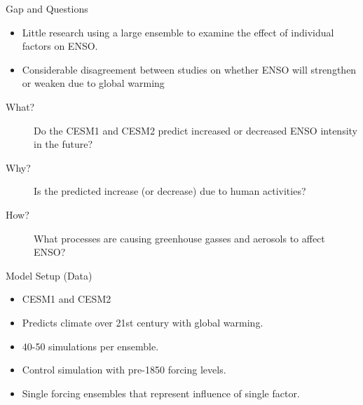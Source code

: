 \documentclass{beamer}
\begin{document}
\begin{frame}{Gap and Questions}
  \begin{itemize}
  \item Little research using a large ensemble to examine the effect of individual factors on ENSO.
  \item Considerable disagreement between studies on whether ENSO will strengthen or weaken due to global warming
  \end{itemize}
  \begin{description}
  \item[What?] Do the CESM1 and CESM2 predict increased or decreased ENSO intensity in the future?
  \item[Why?] Is the predicted increase (or decrease) due to human activities?
  \item[How?] What processes are causing greenhouse gasses and aerosols to affect ENSO?
  \end{description}
\end{frame}


\begin{frame}{Model Setup (Data)}
  \begin{itemize}
  \item CESM1 \citep{kay2015community} and CESM2 \citep{danabasoglu2020community}
  \item Predicts climate over 21st century with global warming.
  \item 40-50 simulations per ensemble.
  \item Control simulation with pre-1850 forcing levels.
  \item Single forcing ensembles that represent influence of single factor.
  \end{itemize}
\end{frame}
\end{document}

